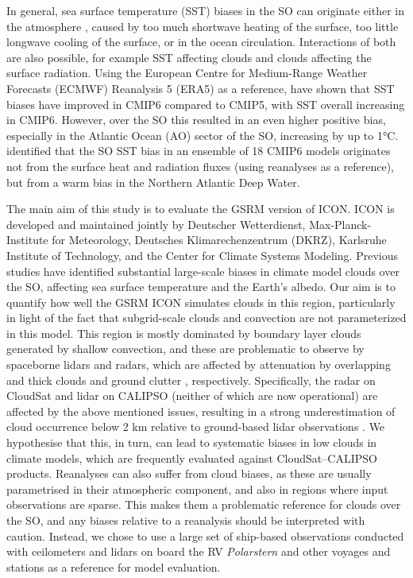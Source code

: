 \documentclass[12pt,a4paper]{article}
\begin{document}
In general, sea surface temperature (SST) biases in the SO can originate either
in the atmosphere \citep{hyder2018}, caused by too much shortwave heating of
the surface, too little longwave cooling of the surface, or in the ocean
circulation. Interactions of both are also possible, for example SST affecting
clouds and clouds affecting the surface radiation. Using the European Centre
for Medium-Range Weather Forecasts (ECMWF) Reanalysis 5 (ERA5) as a reference,
\cite{zhang2023} have shown that SST biases have improved in CMIP6 compared to
CMIP5, with SST overall increasing in CMIP6. However, over the
SO this resulted in an even higher positive bias, especially in the Atlantic
Ocean (AO) sector of the SO, increasing by up to 1°C.  \cite{luo2023}
identified that the SO SST bias in an ensemble of 18 CMIP6 models originates
not from the surface heat and radiation fluxes (using reanalyses as a
reference), but from a warm bias in the Northern Atlantic Deep Water.

The main aim of this study is to evaluate the GSRM version of ICON. ICON
is developed and maintained jointly by Deutscher Wetterdienst,
Max-Planck-Institute for Meteorology, Deutsches Klimarechenzentrum (DKRZ),
Karlsruhe Institute of Technology, and the Center for Climate Systems Modeling.
Previous studies have identified substantial large-scale biases in climate
model clouds over the SO, affecting sea surface temperature and the Earth’s
albedo. Our aim is to quantify how well the GSRM ICON simulates clouds in
this region, particularly in light of the fact that subgrid-scale clouds and
convection are not parameterized in this model. This region is mostly dominated
by boundary layer clouds generated by shallow convection, and these are
problematic to observe by spaceborne lidars and radars, which are affected by
attenuation by overlapping and thick clouds \citep{mace2009,medeiros2010} and
ground clutter \citep{marchand2008}, respectively.  Specifically, the radar on
CloudSat and lidar on CALIPSO (neither of which are now operational) are
affected by the above mentioned issues, resulting in a strong underestimation of
cloud occurrence below 2 km relative to ground-based lidar observations
\citep{mcerlich2021}.  We hypothesise that this, in turn, can lead to
systematic biases in low clouds in climate models, which are frequently
evaluated against CloudSat--CALIPSO products. Reanalyses can also suffer from
cloud biases, as these are usually parametrised in their atmospheric component,
and also in regions where input observations are sparse. This makes them a
problematic reference for clouds over the SO, and any biases relative to a
reanalysis should be interpreted with caution. Instead, we chose to use a large
set of ship-based observations conducted with ceilometers and lidars on board
the RV \emph{Polarstern} and other voyages and stations as a reference for model evaluation.
\end{document}
